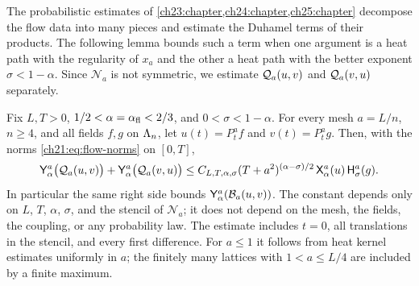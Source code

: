 The probabilistic estimates of \cref{ch23:chapter,ch24:chapter,ch25:chapter} decompose the flow data into many pieces and estimate the Duhamel terms of their products. The following lemma bounds such a term when one argument is a heat path with the regularity of $x_a$ and the other a heat path with the better exponent $\sigma<1-\alpha$. Since $\mathcal N_a$ is not symmetric, we estimate $\mathcal Q_{a}(u,v)$ and $\mathcal Q_{a}(v,u)$ separately.

\begin{lemma}\label{ch21:lem:ordered-duhamel-products}
Fix $L,T>0$, $1/2<\alpha=\alpha_{\mathrm{fl}}<2/3$, and $0<\sigma<1-\alpha$. For every mesh $a=L/n$, $n\ge4$, and all fields $f,g$ on $\Lambda_{n}$, let $u(t)=P^a_tf$ and $v(t)=P^a_tg$. Then, with the norms \eqref{ch21:eq:flow-norms} on $[0,T]$,
\[
 \mathsf Y_{\alpha}^{a}\bigl(\mathcal Q_{a}(u,v)\bigr)+\mathsf Y_{\alpha}^{a}\bigl(\mathcal Q_{a}(v,u)\bigr)\le C_{L,T,\alpha,\sigma}(T+a^2)^{(\alpha-\sigma)/2}\,\mathsf X_{\alpha}^{a}(u)\,\mathsf H_{\sigma}^{a}(g).
\]
In particular the same right side bounds $\mathsf Y_{\alpha}^{a}(\mathcal B_{a}(u,v))$. The constant depends only on $L$, $T$, $\alpha$, $\sigma$, and the stencil of $\mathcal N_a$; it does not depend on the mesh, the fields, the coupling, or any probability law. The estimate includes $t=0$, all translations in the stencil, and every first difference. For $a\le1$ it follows from heat kernel estimates uniformly in $a$; the finitely many lattices with $1<a\le L/4$ are included by a finite maximum.
\end{lemma}

